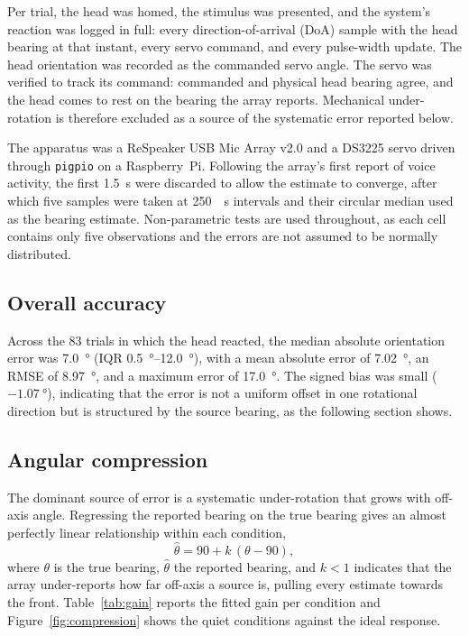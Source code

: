 Per trial, the head was homed, the stimulus was presented, and the system's
reaction was logged in full: every direction-of-arrival (DoA) sample with the
head bearing at that instant, every servo command, and every pulse-width
update. The head orientation was recorded as the commanded servo angle. The
servo was verified to track its command: commanded and physical head bearing
agree, and the head comes to rest on the bearing the array reports. Mechanical
under-rotation is therefore excluded as a source of the systematic error
reported below.

The apparatus was a ReSpeaker USB Mic Array v2.0 and a DS3225 servo driven
through \texttt{pigpio} on a Raspberry~Pi. Following the array's first report
of voice activity, the first \SI{1.5}{\second} were discarded to allow the
estimate to converge, after which five samples were taken at \SI{250}{\milli
\second} intervals and their circular median used as the bearing estimate.
Non-parametric tests are used throughout, as each cell contains only five
observations and the errors are not assumed to be normally distributed.

\subsection{Overall accuracy}

Across the 83 trials in which the head reacted, the median absolute orientation
error was \SI{7.0}{\degree} (IQR \SIrange{0.5}{12.0}{\degree}), with a mean
absolute error of \SI{7.02}{\degree}, an RMSE of \SI{8.97}{\degree}, and a
maximum error of \SI{17.0}{\degree}. The signed bias was small
($-\SI{1.07}{\degree}$), indicating that the error is not a uniform offset in
one rotational direction but is structured by the source bearing, as the
following section shows.

\subsection{Angular compression}
\label{sec:compression}

The dominant source of error is a systematic under-rotation that grows with
off-axis angle. Regressing the reported bearing on the true bearing gives an
almost perfectly linear relationship within each condition,
\begin{equation}
  \hat{\theta} = 90 + k\,(\theta - 90),
  \label{eq:compression}
\end{equation}
where $\theta$ is the true bearing, $\hat{\theta}$ the reported bearing, and
$k < 1$ indicates that the array under-reports how far off-axis a source is,
pulling every estimate towards the front. Table~\ref{tab:gain} reports the
fitted gain per condition and Figure~\ref{fig:compression} shows the quiet
conditions against the ideal response.

